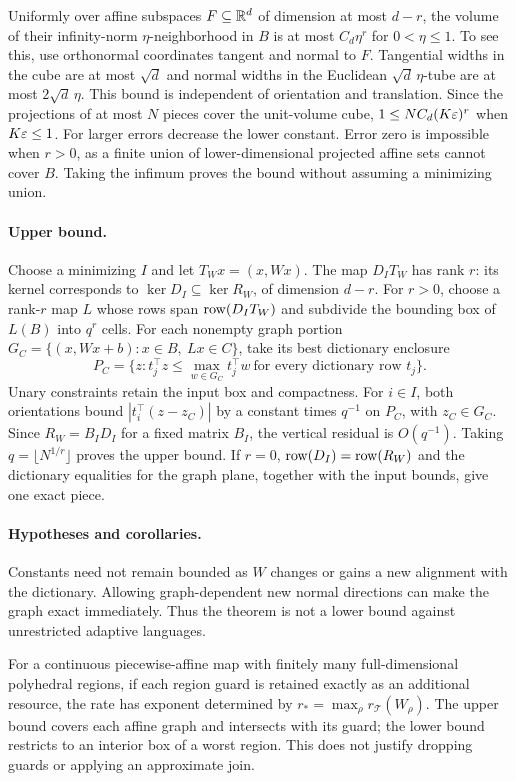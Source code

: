 Uniformly over affine subspaces $F\subseteq\mathbb R^d$ of dimension at most $d-r$, the volume of their infinity-norm $\eta$-neighborhood in $B$ is at most $C_d\eta^r$ for $0<\eta\le1$. To see this, use orthonormal coordinates tangent and normal to $F$. Tangential widths in the cube are at most $\sqrt d$ and normal widths in the Euclidean $\sqrt d\,\eta$-tube are at most $2\sqrt d\,\eta$. This bound is independent of orientation and translation. Since the projections of at most $N$ pieces cover the unit-volume cube,
$1\le NC_d(K\varepsilon)^r$ when $K\varepsilon\le1$.
For larger errors decrease the lower constant. Error zero is impossible when $r>0$, as a finite union of lower-dimensional projected affine sets cannot cover $B$. Taking the infimum proves the bound without assuming a minimizing union.

\paragraph{Upper bound.}
Choose a minimizing $I$ and let $T_Wx=(x,Wx)$. The map $D_IT_W$ has rank $r$: its kernel corresponds to $\ker D_I\subseteq\ker R_W$, of dimension $d-r$. For $r>0$, choose a rank-$r$ map $L$ whose rows span $\operatorname{row}(D_IT_W)$ and subdivide the bounding box of $L(B)$ into $q^r$ cells. For each nonempty graph portion
$G_C=\{(x,Wx+b):x\in B,\ Lx\in C\}$, take its best dictionary enclosure
\[
P_C=\{z:t_j^\top z\le\max_{w\in G_C}t_j^\top w\ \text{for every dictionary row }t_j\}.
\]
Unary constraints retain the input box and compactness. For $i\in I$, both orientations bound $|t_i^\top(z-z_C)|$ by a constant times $q^{-1}$ on $P_C$, with $z_C\in G_C$. Since $R_W=B_ID_I$ for a fixed matrix $B_I$, the vertical residual is $O(q^{-1})$. Taking $q=\lfloor N^{1/r}\rfloor$ proves the upper bound. If $r=0$, $\operatorname{row}(D_I)=\operatorname{row}(R_W)$ and the dictionary equalities for the graph plane, together with the input bounds, give one exact piece.

\paragraph{Hypotheses and corollaries.}
Constants need not remain bounded as $W$ changes or gains a new alignment with the dictionary. Allowing graph-dependent new normal directions can make the graph exact immediately. Thus the theorem is not a lower bound against unrestricted adaptive languages.

For a continuous piecewise-affine map with finitely many full-dimensional polyhedral regions, if each region guard is retained exactly as an additional resource, the rate has exponent determined by $r_*=\max_\rho r_{\mathcal T}(W_\rho)$. The upper bound covers each affine graph and intersects with its guard; the lower bound restricts to an interior box of a worst region. This does not justify dropping guards or applying an approximate join.

